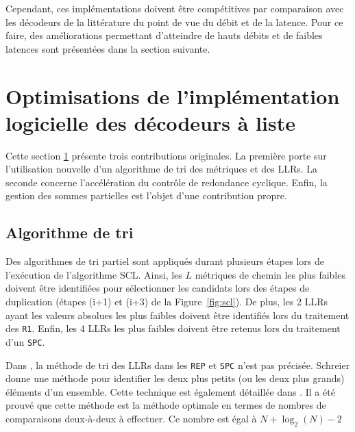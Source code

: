 Cependant, ces implémentations doivent être compétitives par comparaison avec les décodeurs de la littérature du point de vue du débit et de la latence. Pour ce faire, des améliorations permettant d'atteindre de hauts débits et de faibles latences sont présentées dans la section suivante.

\section{Optimisations de l'implémentation logicielle des décodeurs à liste}
\label{sec:opti_scl}
Cette section \ref{sec:opti_scl} présente trois contributions originales. La première porte sur l'utilisation nouvelle d'un algorithme de tri des métriques et des LLRs. La seconde concerne l'accélération du contrôle de redondance cyclique. Enfin, la gestion des sommes partielles est l'objet d'une contribution propre.

\subsection{Algorithme de tri}
Des algorithmes de tri partiel sont appliqués durant plusieurs étapes lors de l'exécution de l'algorithme SCL. Ainsi, les $L$ métriques de chemin les plus faibles doivent être identifiées pour sélectionner les candidats lors des étapes de duplication (étapes (i+1) et (i+3) de la Figure~\ref{fig:scl}). De plus, les 2 LLRs ayant les valeurs absolues les plus faibles doivent être identifiés lors du traitement des \noeuds \texttt{R1}. Enfin, les 4 LLRs les plus faibles doivent être retenus lors du traitement d'un \noeud \texttt{SPC}. 


Dans \cite{sarkis_fast_2016}, la méthode de tri des LLRs dans les \noeuds \texttt{REP} et \texttt{SPC} n'est pas précisée.
Schreier \cite{schreier_tournament_1932} donne une méthode pour identifier les deux plus petits (ou les deux plus grands) éléments d'un ensemble. Cette technique est également détaillée dans \cite{knuth_art_1973}. 
Il a été prouvé que cette méthode est la méthode optimale en termes de nombres de comparaisons deux-à-deux à effectuer.
Ce nombre est égal à $N+\log_2(N)-2$


